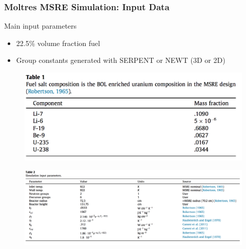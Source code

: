 \begin{frame}
  \frametitle{Moltres MSRE Simulation: Input Data}
     \begin{block}{Main input parameters \cite{lindsay_introduction_2018}}
     	\begin{itemize}
     		\item 22.5\% volume fraction fuel
     		\item Group constants generated with SERPENT or NEWT (3D or 2D)
     	\end{itemize}
              \begin{figure}[t]
                 \vspace*{-0.15in}
                 \hspace*{-2.0in}
                \includegraphics[height=0.2\textwidth]{./images/moltres-composition.png}
               \end{figure}     
               \begin{figure}[t]
                 \vspace*{-0.25in}
                \includegraphics[height=0.33\textwidth]{./images/moltres-input.png}
               \end{figure}   

	\end{block}
	
\end{frame}